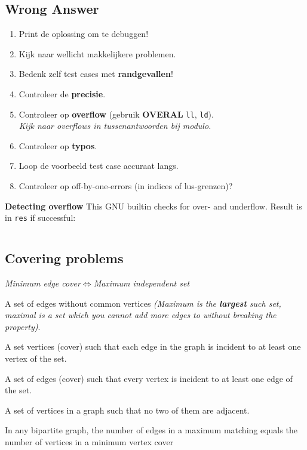 \documentclass[8pt,a4paper,landscape,oneside]{amsart}
\newcommand{\code}[1]{\inputminted[fontsize=\normalsize,baselinestretch=1,breaklines,tabsize=2]{cpp}{code/#1}}
\begin{document}
\begin{multicols*}{3}
\subsection{Wrong Answer}

\begin{enumerate}
	\setlength\itemsep{-.25em}
	\item Print de oplossing om te debuggen!
	\item Kijk naar wellicht makkelijkere problemen.
	\item Bedenk zelf test cases met \textbf{randgevallen}!
	\item Controleer de \textbf{precisie}.
	\item Controleer op \textbf{overflow} (gebruik \textbf{OVERAL} \texttt{ll}, \texttt{ld}).
		\\ \textit{Kijk naar overflows in tussenantwoorden bij modulo.}
	\item Controleer op \textbf{typo\textquotesingle s}.
	\item Loop de voorbeeld test case accuraat langs.
	\item Controleer op off-by-one-errors (in indices of lus-grenzen)?
\end{enumerate}

\textbf{Detecting overflow}
This GNU builtin checks for over- and underflow. Result is in \texttt{res} if successful:
\code{other/overflow.cpp}

\subsection{Covering problems}

\begin{center}
	\emph{Minimum edge cover$\iff$Maximum independent set}
\end{center}

\begin{description}
	\setlength\itemsep{-.25em}
	\item[Matching]
		A set of edges without common vertices \textit{(Maximum is the \textbf{largest} such set, maximal is a set which you cannot add more edges to without breaking the property)}.
	\item[Minimum Vertex Cover]
		A set vertices (cover) such that each edge in the graph is incident to at least one vertex of the set.
	\item[Minimum Edge Cover]
		A set of edges (cover) such that every vertex is incident to at least one edge of the set.
	\item[Maximum Independent Set]
		A set of vertices in a graph such that no two of them are adjacent.
	\item[K\"{o}nig's theorem]
		In any bipartite graph, the number of edges in a maximum matching equals the number of vertices in a minimum vertex cover
\end{description}


\end{multicols*}
\end{document}
